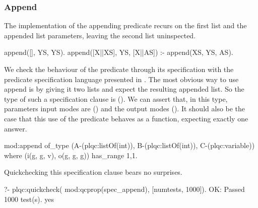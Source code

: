

\subsubsection{Append}
The implementation of the appending predicate recurs on the first list
and the appended list parameters, leaving the second list uninspected.
%
\begin{yapcode}
 append([], YS, YS).
 append([X||XS], YS, [X||AS]) :-
   append(XS, YS, AS).
\end{yapcode}
%
We check the behaviour of the  predicate
through its specification with the predicate specification language
presented in .
%
The most obvious way to use append is by giving it two lists and expect
the resulting appended list.
%
So the type of such a specification clause is
().
%
We can assert that, in this \plqc{} type, parameters input modes are
() and the output modes ().
%
It should also be the case that this use of the predicate behaves as a
function, expecting exactly one answer.
%
\begin{yapcode}
 mod:append
   of_type (A-(plqc:listOf(int)),
     B-(plqc:listOf(int)), C-(plqc:variable))
   where (i(g, g, v), o(g, g, g))
   has_range {1,1}.
\end{yapcode}
%
Quickchecking this specification clause bears no surprises.
%
\begin{yapcode}
   ?- plqc:quickcheck(
        mod:qcprop(spec_append),
        [{numtests, 1000}]).
 OK: Passed 1000 test(s).
 yes
\end{yapcode}


